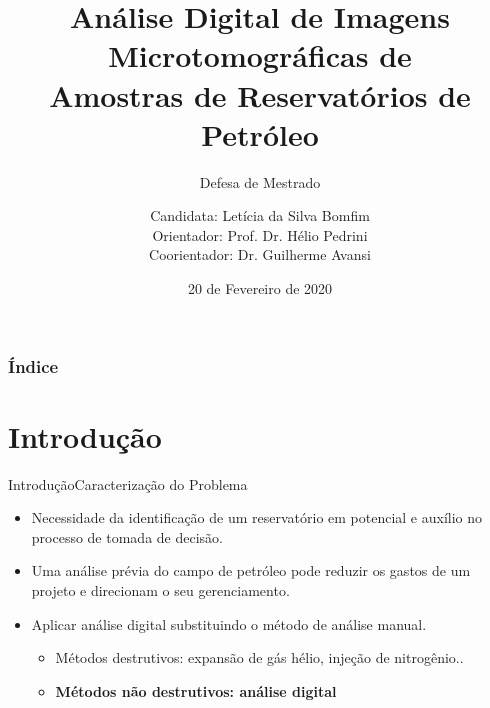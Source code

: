 \documentclass{beamer}
\title[Defesa de Mestrado]{Análise Digital de Imagens Microtomográficas de \\[0.1cm] Amostras de Reservatórios de Petróleo } %
\author[UNICAMP]{Candidata: Letícia da Silva Bomfim \\ Orientador: Prof. Dr. Hélio Pedrini \\Coorientador: Dr. Guilherme Avansi} %
\institute[]{Universidade Estadual de Campinas \\ Instituto de Computação}
\subtitle{Defesa de Mestrado}
\date{20 de Fevereiro de 2020} %
\begin{document}
\begin{frame}
\titlepage %
\end{frame}

\begin{frame}
\frametitle{Índice} %
\tableofcontents %
\end{frame}


\section{Introdução} %




\begin{frame}{Introdução}{Caracterização do Problema}
\begin{itemize}

\item Necessidade da identificação de um reservatório em potencial e auxílio no processo de tomada de decisão.

\item Uma análise prévia do campo de petróleo pode reduzir os gastos de um projeto e direcionam o seu gerenciamento. 

\item Aplicar análise digital substituindo o método de análise manual.
\begin{itemize}
\item Métodos destrutivos: expansão de gás hélio, injeção de nitrogênio..
\item \textbf{Métodos não destrutivos: análise digital}
\end{itemize}
\end{itemize}

\end{frame}
\end{document}
